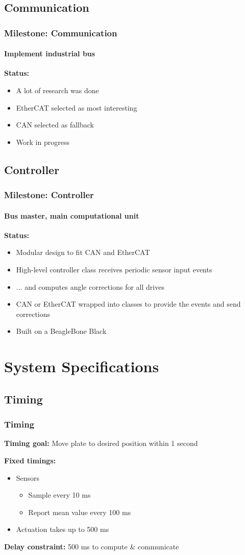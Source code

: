 \documentclass{beamer}
\begin{document}
\subsection{Communication}
\begin{frame}
  \frametitle{Milestone: Communication}
  \framesubtitle{Implement industrial bus}
  \textbf{Status:}
	\begin{itemize}
		\item A lot of research was done
		\item EtherCAT selected as most interesting
		\item CAN selected as fallback
		\item Work in progress
	\end{itemize}
\end{frame}

\subsection{Controller}
\begin{frame}
  \frametitle{Milestone: Controller}
  \framesubtitle{Bus master, main computational unit}
  \textbf{Status:}
	\begin{itemize}
		\item Modular design to fit CAN and EtherCAT
		\item High-level controller class receives periodic sensor input events
		\item ... and computes angle corrections for all drives
		\item CAN or EtherCAT wrapped into classes to provide the events and send corrections
		\item Built on a BeagleBone Black
	\end{itemize}
\end{frame}


\section{System Specifications}
\subsection{Timing}
\begin{frame}
	\frametitle{Timing}
	\textbf{Timing goal:} Move plate to desired position within 1 second
	
	\vfill
	
	\textbf{Fixed timings:}
	\begin{itemize}
		\item Sensors
			\begin{itemize}
				\item Sample every 10 ms
				\item Report mean value every 100 ms
			\end{itemize}
		\item Actuation takes up to 500 ms
	\end{itemize}
	
	\vfill
	
	\textbf{Delay constraint:} 500 ms to compute \& communicate
\end{frame}
\end{document}
